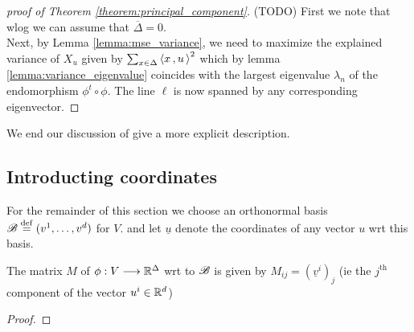 \documentclass{dsp}
\begin{document}
\begin{proof}[proof of Theorem \ref{theorem:principal_component}]
(TODO) First we note that wlog we can assume that $\overline{\Delta}=0$.\\
Next, by Lemma \ref{lemma:mse_variance}, we need to maximize the explained variance of $X_u$ given by  $\sum_{x\in\Delta}\left\langle x\,,u\, \right\rangle^2$ which by lemma \ref{lemma:variance_eigenvalue} coincides with the largest eigenvalue $\lambda_n$ of the endomorphism $\phi^t\circ \phi$. The line $\ell$ is now spanned by any corresponding eigenvector.
\end{proof}

We end our discussion of give a more explicit description.


\subsection{Introducting coordinates}
\label{subsubsection:introducing_coordinates}

For the remainder of this section we choose an orthonormal basis $\r{B}\define(v^1,\ldots, v^d)$ for $V$. and let $\underline{u}$ denote the coordinates of any vector $u$ wrt this basis.\\

\begin{lemma}
\label{lemma:matrix_of_phi}
The matrix $M$ of $\phi: V\longrightarrow \mathbb{R}^\Delta$ wrt to $\r{B}$ is given by $M_{ij} = (\underline{v}^i)_j$ (ie the $j^\text{th}$ component of the vector $u^i \in \mathbb{R}^d$)
\end{lemma}

\begin{proof}

\end{proof}
\end{document}

